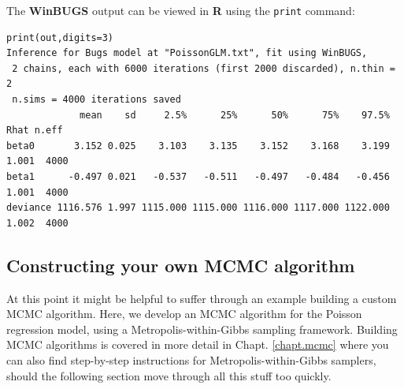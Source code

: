 The {\bf WinBUGS} output can be viewed in {\bf R} using the {\tt print} command:
{\small
\begin{verbatim}
print(out,digits=3)
Inference for Bugs model at "PoissonGLM.txt", fit using WinBUGS,
 2 chains, each with 6000 iterations (first 2000 discarded), n.thin = 2
 n.sims = 4000 iterations saved
             mean    sd     2.5%      25%      50%      75%    97.5%  Rhat n.eff
beta0       3.152 0.025    3.103    3.135    3.152    3.168    3.199 1.001  4000
beta1      -0.497 0.021   -0.537   -0.511   -0.497   -0.484   -0.456 1.001  4000
deviance 1116.576 1.997 1115.000 1115.000 1116.000 1117.000 1122.000 1.002  4000
\end{verbatim}
}




\subsection{ Constructing your own MCMC algorithm}
\label{GLMM.sect.mcmc}

At this point it might be helpful to suffer through an example
building a custom MCMC algorithm. Here, we develop an MCMC algorithm
for
the Poisson regression model, using a Metropolis-within-Gibbs sampling framework. 
Building MCMC algorithms is covered in more detail in Chapt. \ref{chapt.mcmc} where 
you can also find step-by-step instructions for Metropolis-within-Gibbs samplers, 
should the following section move through all this stuff too quickly.  

